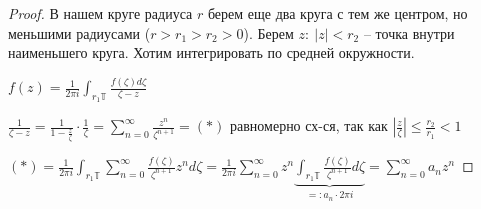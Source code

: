 \begin{proof}
    В нашем круге радиуса $r$ берем еще два круга с тем же центром, но меньшими радиусами ($r > r_1 > r_2 > 0$). Берем $z: \ |z| < r_2$ -- точка внутри наименьшего круга. Хотим интегрировать по средней окружности.

    $f(z) = \frac{1}{2 \pi i} \int_{r_1 \mathbb{T}} { \frac{f(\zeta) d \zeta }{\zeta - z} }$

    $\frac{1}{\zeta - z} = \frac{1}{1 - \frac{z}{\zeta}} \cdot \frac{1}{\zeta} = \sum_{n=0}^{\infty} \frac{z^n}{\zeta^{n+1}} = (*)$ равномерно сх-ся, так как $\left| \frac{z}{\zeta} \right| \leq \frac{r_2}{r_1} < 1$

    $(*) = \frac{1}{2\pi i} \int_{r_1 \mathbb{T}} { \sum_{n=0}^{\infty} \frac{f(\zeta)}{\zeta^{n+1}} z^n d\zeta } = \frac{1}{2\pi i} \sum_{n=0}^{\infty} z^n \underbrace{\int_{r_1 \mathbb{T}} {\frac{f(\zeta)}{\zeta^{n+1}} d\zeta}}_{=: a_n \cdot 2\pi i} = \sum_{n=0}^{\infty} {a_n z^n}$
\end{proof}



